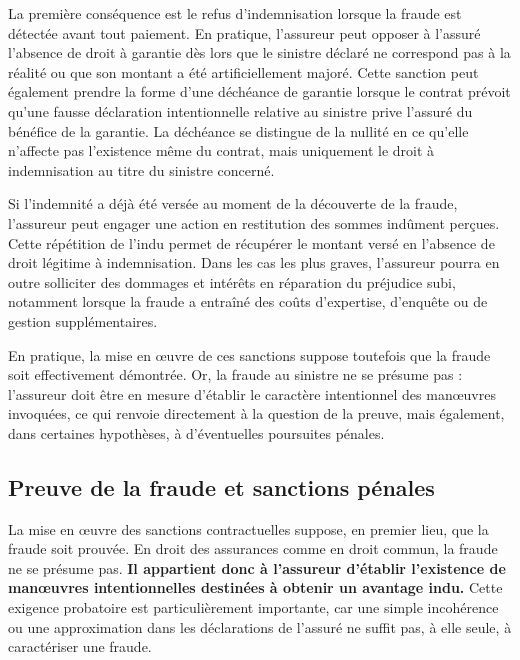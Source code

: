 La première conséquence est le refus d'indemnisation lorsque la fraude est détectée avant tout paiement. En pratique, l'assureur peut opposer à l'assuré l'absence de droit à garantie dès lors que le sinistre déclaré ne correspond pas à la réalité ou que son montant a été artificiellement majoré. Cette sanction peut également prendre la forme d'une déchéance de garantie lorsque le contrat prévoit qu'une fausse déclaration intentionnelle relative au sinistre prive l'assuré du bénéfice de la garantie. La déchéance se distingue de la nullité en ce qu'elle n'affecte pas l'existence même du contrat, mais uniquement le droit à indemnisation au titre du sinistre concerné.

Si l'indemnité a déjà été versée au moment de la découverte de la fraude, l'assureur peut engager une action en restitution des sommes indûment perçues. Cette répétition de l'indu permet de récupérer le montant versé en l'absence de droit légitime à indemnisation. Dans les cas les plus graves, l'assureur pourra en outre solliciter des dommages et intérêts en réparation du préjudice subi, notamment lorsque la fraude a entraîné des coûts d'expertise, d'enquête ou de gestion supplémentaires.

En pratique, la mise en œuvre de ces sanctions suppose toutefois que la fraude soit effectivement démontrée. Or, la fraude au sinistre ne se présume pas : l'assureur doit être en mesure d'établir le caractère intentionnel des manœuvres invoquées, ce qui renvoie directement à la question de la preuve, mais également, dans certaines hypothèses, à d'éventuelles poursuites pénales.

\subsection{Preuve de la fraude et sanctions pénales}

La mise en œuvre des sanctions contractuelles suppose, en premier lieu, que la fraude soit prouvée. En droit des assurances comme en droit commun, la fraude ne se présume pas. \textbf{Il appartient donc à l'assureur d'établir l'existence de manœuvres intentionnelles destinées à obtenir un avantage indu.} Cette exigence probatoire est particulièrement importante, car une simple incohérence ou une approximation dans les déclarations de l'assuré ne suffit pas, à elle seule, à caractériser une fraude.

